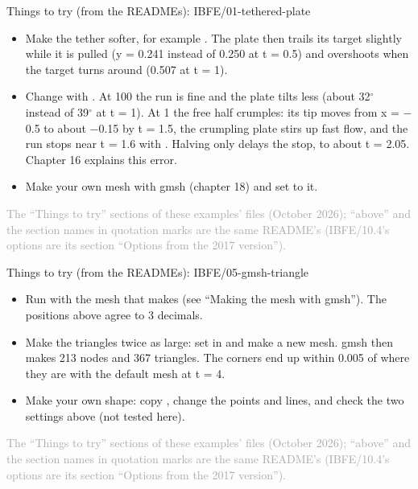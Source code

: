 \documentclass[aspectratio=169,11pt]{beamer}
\newcommand{\sourcecredit}[1]{\vfill\begin{flushright}\tiny\textcolor{DarkGray}{#1}\end{flushright}}
\begin{document}
\begin{frame}{Things to try (from the READMEs): IBFE/01-tethered-plate}
\scriptsize\setlength{\leftmargini}{5em}
\begin{itemize}\setlength{\itemsep}{1pt}
  \item[IBFE/01.1] Make the tether softer, for example . The plate then trails its target slightly while it is pulled (y = 0.241 instead of 0.250 at t = 0.5) and overshoots when the target turns around (0.507 at t = 1).
  \item[IBFE/01.2] Change  with . At 100 the run is fine and the plate tilts less (about 32$^\circ$ instead of 39$^\circ$ at t = 1). At 1 the free half crumples: its tip moves from x = $-$0.5 to about $-$0.15 by t = 1.5, the crumpling plate stirs up fast flow, and the run stops near t = 1.6 with . Halving  only delays the stop, to about t = 2.05. Chapter 16 explains this error.
  \item[IBFE/01.3] Make your own mesh with gmsh (chapter 18) and set  to it.
\end{itemize}
\sourcecredit{The ``Things to try'' sections of these examples' \code{README.md} files (October 2026); ``above'' and the section names in quotation marks are the same README's (IBFE/10.4's options are its section ``Options from the 2017 version'').}
\end{frame}

\begin{frame}{Things to try (from the READMEs): IBFE/05-gmsh-triangle}
\scriptsize\setlength{\leftmargini}{5em}
\begin{itemize}\setlength{\itemsep}{1pt}
  \item[IBFE/05.1] Run with the mesh that  makes (see ``Making the mesh with gmsh''). The positions above agree to 3 decimals.
  \item[IBFE/05.2] Make the triangles twice as large: set  in  and make a new mesh. gmsh then makes 213 nodes and 367 triangles. The corners end up within 0.005 of where they are with the default mesh at t = 4.
  \item[IBFE/05.3] Make your own shape: copy , change the points and lines, and check the two settings above (not tested here).
\end{itemize}
\sourcecredit{The ``Things to try'' sections of these examples' \code{README.md} files (October 2026); ``above'' and the section names in quotation marks are the same README's (IBFE/10.4's options are its section ``Options from the 2017 version'').}
\end{frame}
\end{document}
